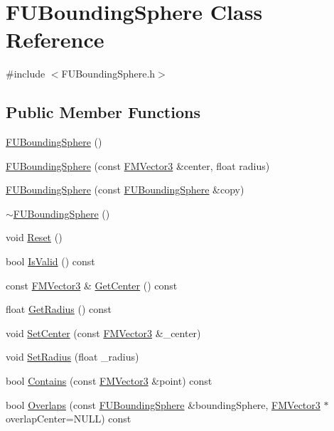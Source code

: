\hypertarget{classFUBoundingSphere}{
\section{FUBoundingSphere Class Reference}
\label{classFUBoundingSphere}
}


{\ttfamily \#include $<$FUBoundingSphere.h$>$}

\subsection*{Public Member Functions}
\begin{DoxyCompactItemize}
\item 
\hyperlink{classFUBoundingSphere_aef103eeefb1810269792877638997fdf}{FUBoundingSphere} ()
\item 
\hyperlink{classFUBoundingSphere_a7a9d33bda02b4c6b20a533568b07e197}{FUBoundingSphere} (const \hyperlink{classFMVector3}{FMVector3} \&center, float radius)
\item 
\hyperlink{classFUBoundingSphere_a759fa8635bcb2b5fca33386a8a30ba08}{FUBoundingSphere} (const \hyperlink{classFUBoundingSphere}{FUBoundingSphere} \&copy)
\item 
\hyperlink{classFUBoundingSphere_a102e9b7c27f1139f4c5e75522df4aa55}{$\sim$FUBoundingSphere} ()
\item 
void \hyperlink{classFUBoundingSphere_a4298b67a087c577a70cbef81d1fa32fa}{Reset} ()
\item 
bool \hyperlink{classFUBoundingSphere_ab986bd085735a8466643e9d638e0a21b}{IsValid} () const 
\item 
const \hyperlink{classFMVector3}{FMVector3} \& \hyperlink{classFUBoundingSphere_af876a90e6e5dbc651a93f658cab8ced5}{GetCenter} () const 
\item 
float \hyperlink{classFUBoundingSphere_a617fa08a1821537b09d73d70955a6fcb}{GetRadius} () const 
\item 
void \hyperlink{classFUBoundingSphere_a9232c3e6042bd31940343c5313e9e337}{SetCenter} (const \hyperlink{classFMVector3}{FMVector3} \&\_\-center)
\item 
void \hyperlink{classFUBoundingSphere_a376d82614f3888dae7312b109dea1ed8}{SetRadius} (float \_\-radius)
\item 
bool \hyperlink{classFUBoundingSphere_afa2a133249cec50f5d0f3175b23c9ff0}{Contains} (const \hyperlink{classFMVector3}{FMVector3} \&point) const 
\item 
bool \hyperlink{classFUBoundingSphere_af25dfeab95de4ac4bde2386b15c76c36}{Overlaps} (const \hyperlink{classFUBoundingSphere}{FUBoundingSphere} \&boundingSphere, \hyperlink{classFMVector3}{FMVector3} $\ast$overlapCenter=NULL) const 

\end{DoxyCompactItemize}
